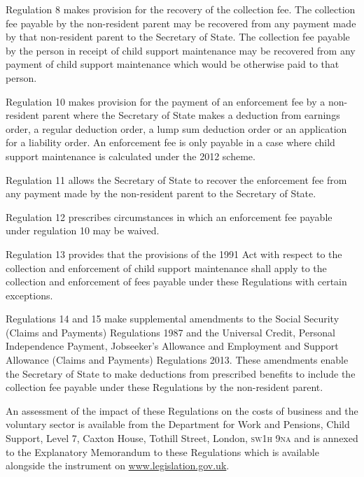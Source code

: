 \documentclass[12pt,a4paper]{article}
\begin{document}
Regulation 8 makes provision for the recovery of the collection fee. The collection fee payable by the non-resident parent may be recovered from any payment made by that non-resident parent to the Secretary of State. The collection fee payable by the person in receipt of child support maintenance may be recovered from any payment of child support maintenance which would be otherwise paid to that person.

Regulation 10 makes provision for the payment of an enforcement fee by a non-resident parent where the Secretary of State makes a deduction from earnings order, a regular deduction order, a lump sum deduction order or an application for a liability order. An enforcement fee is only payable in a case where child support maintenance is calculated under the 2012 scheme.

Regulation 11 allows the Secretary of State to recover the enforcement fee from any payment made by the non-resident parent to the Secretary of State.

Regulation 12 prescribes circumstances in which an enforcement fee payable under regulation 10 may be waived.

Regulation 13 provides that the provisions of the 1991 Act with respect to the collection and enforcement of child support maintenance shall apply to the collection and enforcement of fees payable under these Regulations with certain exceptions.

Regulations 14 and 15 make supplemental amendments to the Social Security (Claims and Payments) Regulations 1987 and the Universal Credit, Personal Independence Payment, Jobseeker’s Allowance and Employment and Support Allowance (Claims and Payments) Regulations 2013. These amendments enable the Secretary of State to make deductions from prescribed benefits to include the collection fee payable under these Regulations by the non-resident parent.

An assessment of the impact of these Regulations on the costs of business and the voluntary sector is available from the Department for Work and Pensions, Child Support, Level 7, Caxton House, Tothill Street, London, \textsc{\lowercase{SW1H 9NA}} and is annexed to the Explanatory Memorandum to these Regulations which is available alongside the instrument on \url{www.legislation.gov.uk}.
\end{document}
